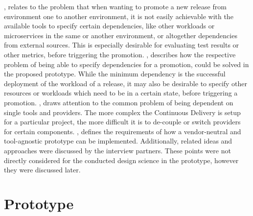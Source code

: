 \textbf{},
relates to the problem that when wanting to promote a new release from environment one to another environment,
it is not easily achievable with the available tools to specify certain dependencies, like other workloads or
microservices in the same or another environment, or altogether dependencies from external sources.
This is especially desirable for evaluating test results or other metrics, before triggering the promotion.
\textbf{},
describes how the respective problem of being able to specify dependencies for a promotion,
could be solved in the proposed prototype. While the minimum dependency is the successful deployment
of the workload of a release,
it may also be desirable to specify other resources or workloads which need to be in a certain state,
before triggering a promotion.
\textbf{},
draws attention to the common problem of being dependent on single tools and providers.
The more complex the Continuous Delivery is setup for a particular project,
the more difficult it is to de-couple or switch providers for certain components.
\textbf{},
defines the requirements of how a vendor-neutral and tool-agnostic prototype can be implemented.
Additionally,
related ideas and approaches were discussed by the interview partners.
These points were not directly considered for the conducted design science in the prototype,
however they were discussed later.

\section*{Prototype}

